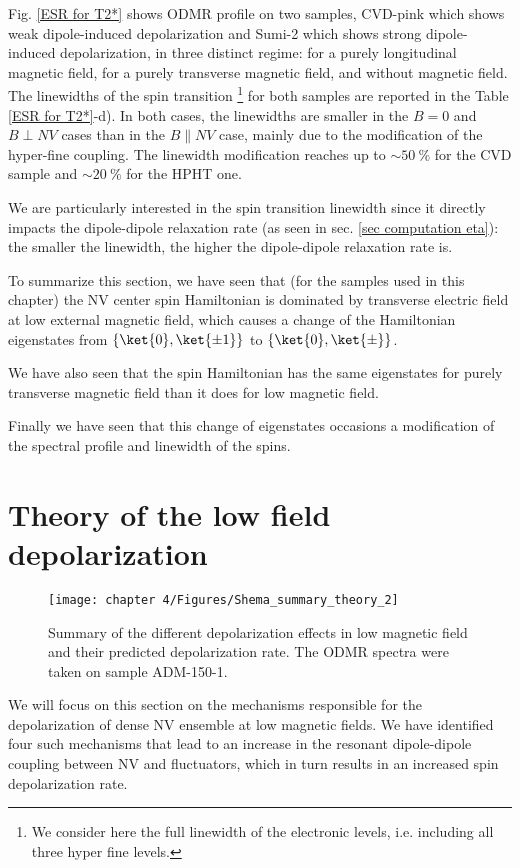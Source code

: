 \documentclass[a4paper, 11pt]{report}
\begin{document}
Fig. \ref{ESR for T2*} shows ODMR profile on two samples, CVD-pink which shows weak dipole-induced depolarization and Sumi-2 which shows strong dipole-induced depolarization, in three distinct regime: for a purely longitudinal magnetic field, for a purely transverse magnetic field, and without magnetic field. The linewidths of the spin transition \footnote{We consider here the full linewidth of the electronic levels, i.e. including all three hyper fine levels.} for both samples are reported in the Table \ref{ESR for T2*}-d). In both cases, the linewidths are smaller in the $B=0$ and $B \perp NV$ cases than in the $B \parallel NV$ case, mainly due to the modification of the hyper-fine coupling. The linewidth modification reaches up to $\sim 50\ \%$ for the CVD sample and $\sim 20\ \%$ for the HPHT one.

We are particularly interested in the spin transition linewidth since it directly impacts the dipole-dipole relaxation rate (as seen in sec. \ref{sec computation eta}): the smaller the linewidth, the higher the dipole-dipole relaxation rate is.

\bigskip

To summarize this section, we have seen that (for the samples used in this chapter) the NV center spin Hamiltonian is dominated by transverse electric field at low external magnetic field, which causes a change of the Hamiltonian eigenstates from $\{ \ket{0}, \ket{\pm 1} \}$ to $\{ \ket{0}, \ket{\pm} \}$. 

We have also seen that the spin Hamiltonian has the same eigenstates for purely transverse magnetic field than it does for low magnetic field. 

Finally we have seen that this change of eigenstates occasions a modification of the spectral profile and linewidth of the spins.

\section{Theory of the low field depolarization}
\label{sec causes zero field}
\begin{figure}[h]
\centering
\texttt{[image: chapter 4/Figures/Shema\_summary\_theory\_2]}
\caption{Summary of the different depolarization effects in low magnetic field and their predicted depolarization rate. The ODMR spectra were taken on sample ADM-150-1.}
\label{summary_theory}
\end{figure}

We will focus on this section on the mechanisms responsible for the depolarization of dense NV ensemble at low magnetic fields. We have identified four such mechanisms that lead to an increase in the resonant dipole-dipole coupling between NV and fluctuators, which in turn results in an increased spin depolarization rate.
\end{document}
